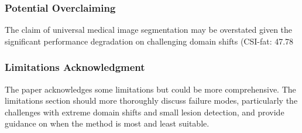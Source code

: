 \subsubsection{Potential Overclaiming}
The claim of universal medical image segmentation may be overstated given the significant performance degradation on challenging domain shifts (CSI-fat: 47.78%

\subsubsection{Limitations Acknowledgment}
The paper acknowledges some limitations but could be more comprehensive. The limitations section should more thoroughly discuss failure modes, particularly the challenges with extreme domain shifts and small lesion detection, and provide guidance on when the method is most and least suitable.
